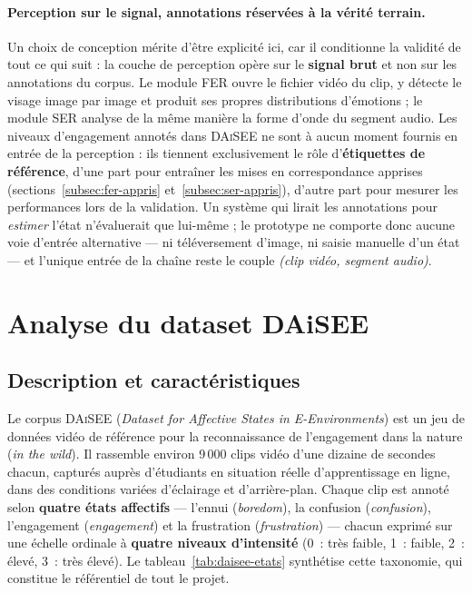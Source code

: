\paragraph{Perception sur le signal, annotations réservées à la vérité terrain.}
Un choix de conception mérite d'être explicité ici, car il conditionne la validité
de tout ce qui suit : la couche de perception opère sur le \textbf{signal brut} et
non sur les annotations du corpus. Le module FER ouvre le fichier vidéo du clip,
y détecte le visage image par image et produit ses propres distributions
d'émotions ; le module SER analyse de la même manière la forme d'onde du segment
audio. Les niveaux d'engagement annotés dans \textsc{DAiSEE} ne sont à aucun
moment fournis en entrée de la perception : ils tiennent exclusivement le rôle
d'\textbf{étiquettes de référence}, d'une part pour entraîner les mises en
correspondance apprises (sections~\ref{subsec:fer-appris}
et~\ref{subsec:ser-appris}), d'autre part pour mesurer les performances lors de la
validation. Un système qui lirait les annotations pour \emph{estimer} l'état
n'évaluerait que lui-même ; le prototype ne comporte donc aucune voie d'entrée
alternative — ni téléversement d'image, ni saisie manuelle d'un état — et l'unique
entrée de la chaîne reste le couple \emph{(clip vidéo, segment audio)}.

\section{Analyse du dataset DAiSEE}
\label{sec:daisee}

\subsection{Description et caractéristiques}

Le corpus \textsc{DAiSEE} (\emph{Dataset for Affective States in E-Environments})
\cite{gupta2016daisee} est un jeu de données vidéo de référence pour la
reconnaissance de l'engagement \og dans la nature \fg{} (\emph{in the wild}). Il
rassemble environ 9\,000 clips vidéo d'une dizaine de secondes chacun, capturés
auprès d'étudiants en situation réelle d'apprentissage en ligne, dans des
conditions variées d'éclairage et d'arrière-plan. Chaque clip est annoté selon
\textbf{quatre états affectifs} — l'ennui (\emph{boredom}), la confusion
(\emph{confusion}), l'engagement (\emph{engagement}) et la frustration
(\emph{frustration}) — chacun exprimé sur une échelle ordinale à
\textbf{quatre niveaux d'intensité} (0~: très faible, 1~: faible, 2~: élevé,
3~: très élevé). Le tableau~\ref{tab:daisee-etats} synthétise cette taxonomie,
qui constitue le référentiel de tout le projet.

